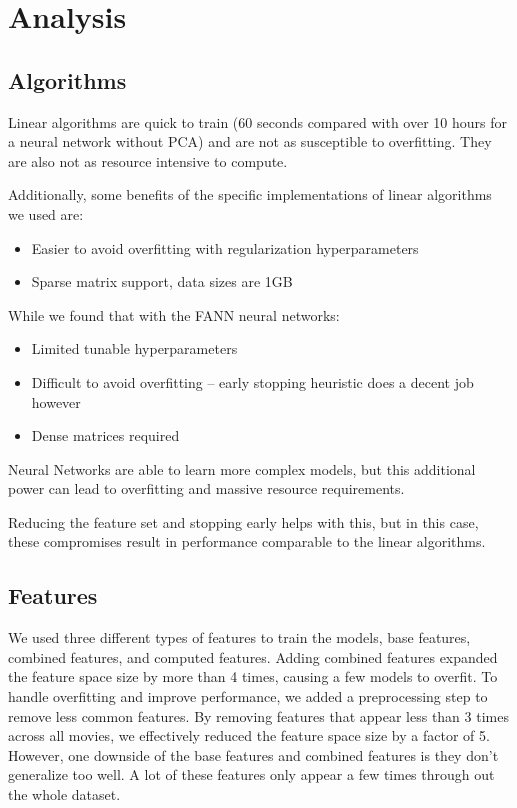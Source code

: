 \documentclass[journal]{IEEEtran}
\begin{document}
\section{Analysis}

\subsection{Algorithms}
Linear algorithms are quick to train (60 seconds compared with over 10 hours
for a neural network without PCA) and are not as susceptible to overfitting.
They are also not as resource intensive to compute.
\\
\par Additionally, some benefits of the specific implementations of linear algorithms we used are:
\begin{itemize}
    \item Easier to avoid overfitting with regularization hyperparameters
    \item Sparse matrix support, data sizes are 1GB
\end{itemize}
\bigskip
\par While we found that with the FANN neural networks:
\begin{itemize}
    \item Limited tunable hyperparameters
    \item Difficult to avoid overfitting -- early stopping heuristic does a decent job however
    \item Dense matrices required
\end{itemize}
\bigskip
\par Neural Networks are able to learn more complex models, but this additional
power can lead to overfitting and massive resource requirements.
\\
\par Reducing the feature set and stopping early helps with this, but in this
case, these compromises result in performance comparable to the linear
algorithms.

\subsection{Features}
We used three different types of features to train the models, base features, combined features, and computed features. Adding combined features expanded the feature space size by more than 4 times, causing a few models to overfit. To handle overfitting and improve performance, we added a preprocessing step to remove less common features. By removing features that appear less than 3 times across all movies, we effectively reduced the feature space size by a factor of 5. However, one downside of the base features and combined features is they don't generalize too well. A lot of these features only appear a few times through out the whole dataset.
\end{document}

